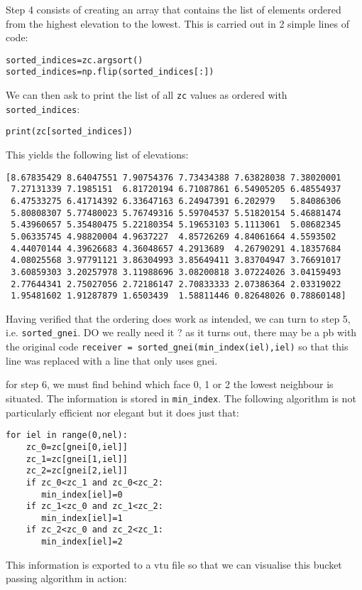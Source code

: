 Step 4 consists of creating an array that contains the list of elements ordered from the 
highest elevation to the lowest.
This is carried out in 2 simple lines of code:
\begin{lstlisting}
sorted_indices=zc.argsort()
sorted_indices=np.flip(sorted_indices[:])
\end{lstlisting}
We can then ask to print the list of all {\tt zc} values as ordered with 
{\tt sorted\_indices}:
\begin{lstlisting}
print(zc[sorted_indices])
\end{lstlisting}
This yields the following list of elevations:
\begin{lstlisting}
[8.67835429 8.64047551 7.90754376 7.73434388 7.63828038 7.38020001
 7.27131339 7.1985151  6.81720194 6.71087861 6.54905205 6.48554937
 6.47533275 6.41714392 6.33647163 6.24947391 6.202979   5.84086306
 5.80808307 5.77480023 5.76749316 5.59704537 5.51820154 5.46881474
 5.43960657 5.35480475 5.22180354 5.19653103 5.1113061  5.08682345
 5.06335745 4.98820004 4.9637227  4.85726269 4.84061664 4.5593502
 4.44070144 4.39626683 4.36048657 4.2913689  4.26790291 4.18357684
 4.08025568 3.97791121 3.86304993 3.85649411 3.83704947 3.76691017
 3.60859303 3.20257978 3.11988696 3.08200818 3.07224026 3.04159493
 2.77644341 2.75027056 2.72186147 2.70833333 2.07386364 2.03319022
 1.95481602 1.91287879 1.6503439  1.58811446 0.82648026 0.78860148]
\end{lstlisting}

Having verified that the ordering does work as intended, 
we can turn to step 5, i.e. {\tt sorted\_gnei}. DO we really need it ?
as it turns out, there may be a pb with the original code 
{\tt receiver = sorted\_gnei(min\_index(iel),iel)}
so that this line was replaced with a line that only uses gnei.

for step 6, we must find behind which face 0, 1 or 2 
the lowest neighbour is situated. The information is stored in {\tt min\_index}.
The following algorithm is not particularly efficient nor elegant but it does 
just that: 

\begin{lstlisting}
for iel in range(0,nel):
    zc_0=zc[gnei[0,iel]]
    zc_1=zc[gnei[1,iel]]
    zc_2=zc[gnei[2,iel]]
    if zc_0<zc_1 and zc_0<zc_2: 
       min_index[iel]=0
    if zc_1<zc_0 and zc_1<zc_2: 
       min_index[iel]=1
    if zc_2<zc_0 and zc_2<zc_1: 
       min_index[iel]=2
\end{lstlisting}

This information is exported to a vtu file so that we can visualise 
this bucket passing algorithm in action:

